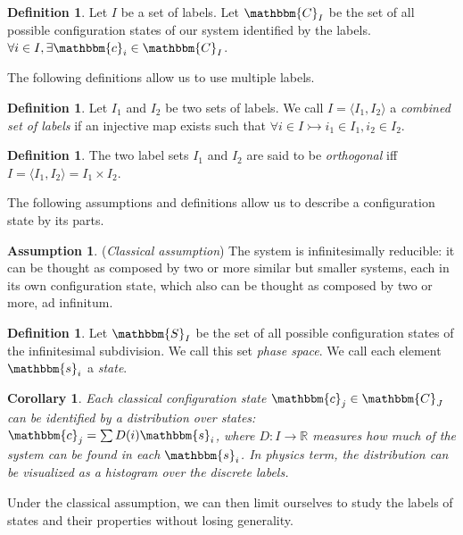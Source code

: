 \documentclass[twocolumn,floatfix,nofootinbib]{revtex4}   %
\theoremstyle{theorem}
\newtheorem{cor}[thm]{Corollary}
\theoremstyle{definition}
\newtheorem{defn}[thm]{Definition}
\newtheorem{assump}[thm]{Assumption}
\begin{document}
\begin{defn}\label{statedef}
Let $I$ be a set of labels. Let $\mathbbm{C}_{I}$ be the set of all possible configuration states of our system identified by the labels. $\forall i \in I, \exists \mathbbm{c}_{i} \in \mathbbm{C}_{I}$.
\end{defn}

The following definitions allow us to use multiple labels.

\begin{defn}\label{combine label}
Let $I_1$ and $I_2$ be two sets of labels. We call $I = \langle I_1, I_2 \rangle$ a \emph{combined set of labels} if an injective map exists such that $\forall i \in I \rightarrowtail i_1 \in I_1, i_2 \in I_2$.
\end{defn}

\begin{defn}\label{orth}
The two label sets $I_1$ and $I_2$ are said to be \emph{orthogonal} iff $I = \langle I_1, I_2 \rangle = I_1 \times I_2$.
\end{defn}

The following assumptions and definitions allow us to describe a configuration state by its parts.

\begin{assump}\label{classical}
(\emph{Classical assumption}) The system is infinitesimally reducible: it can be thought as composed by two or more similar but smaller systems, each in its own configuration state, which also can be thought as composed by two or more, ad infinitum.
\end{assump}

\begin{defn}\label{statedef}
Let $\mathbbm{S}_I$ be the set of all possible configuration states of the infinitesimal subdivision. We call this set \emph{phase space}. We call each element $\mathbbm{s}_i$ a \emph{state}.
\end{defn}

\begin{cor}\label{statedistr}
Each classical configuration state $\mathbbm{c}_j \in \mathbbm{C}_J$ can be identified by a distribution over states: $\mathbbm{c}_j=\sum D(i) \mathbbm{s}_i$, where $D:I\rightarrow\mathbb{R}$ measures how much of the system can be found in each $\mathbbm{s}_i$. In physics term, the distribution can be visualized as a histogram over the discrete labels.
\end{cor}

Under the classical assumption, we can then limit ourselves to study the labels of states and their properties without losing generality.
\end{document}

